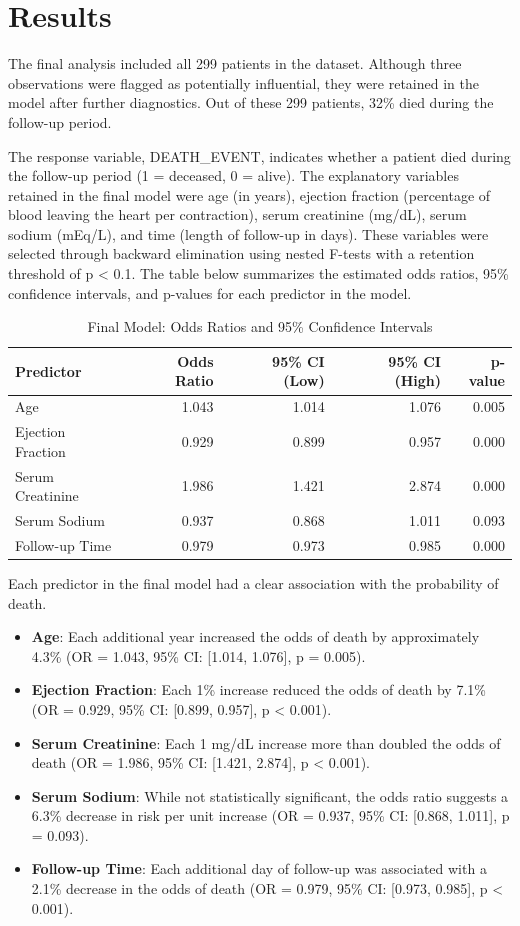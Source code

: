 \documentclass[
  letterpaper,
  DIV=11,
  numbers=noendperiod]{scrartcl}
\begin{document}
\hypertarget{results}{%
\section{Results}\label{results}}

The final analysis included all 299 patients in the dataset. Although
three observations were flagged as potentially influential, they were
retained in the model after further diagnostics. Out of these 299
patients, 32\% died during the follow-up period.

The response variable, DEATH\_EVENT, indicates whether a patient died
during the follow-up period (1 = deceased, 0 = alive). The explanatory
variables retained in the final model were age (in years), ejection
fraction (percentage of blood leaving the heart per contraction), serum
creatinine (mg/dL), serum sodium (mEq/L), and time (length of follow-up
in days). These variables were selected through backward elimination
using nested F-tests with a retention threshold of p \textless{} 0.1.
The table below summarizes the estimated odds ratios, 95\% confidence
intervals, and p-values for each predictor in the model.

\begin{longtable}[t]{lrrrr}
\caption{Final Model: Odds Ratios and 95\% Confidence Intervals}\\
\toprule
Predictor & Odds Ratio & 95\% CI (Low) & 95\% CI (High) & p-value\\
\midrule
Age & 1.043 & 1.014 & 1.076 & 0.005\\
Ejection Fraction & 0.929 & 0.899 & 0.957 & 0.000\\
Serum Creatinine & 1.986 & 1.421 & 2.874 & 0.000\\
Serum Sodium & 0.937 & 0.868 & 1.011 & 0.093\\
Follow-up Time & 0.979 & 0.973 & 0.985 & 0.000\\
\bottomrule
\end{longtable}

Each predictor in the final model had a clear association with the
probability of death.

\begin{itemize}
\item
  \textbf{Age}: Each additional year increased the odds of death by
  approximately 4.3\% (OR = 1.043, 95\% CI: {[}1.014, 1.076{]}, p =
  0.005).
\item
  \textbf{Ejection Fraction}: Each 1\% increase reduced the odds of
  death by 7.1\% (OR = 0.929, 95\% CI: {[}0.899, 0.957{]}, p \textless{}
  0.001).
\item
  \textbf{Serum Creatinine}: Each 1 mg/dL increase more than doubled the
  odds of death (OR = 1.986, 95\% CI: {[}1.421, 2.874{]}, p \textless{}
  0.001).
\item
  \textbf{Serum Sodium}: While not statistically significant, the odds
  ratio suggests a 6.3\% decrease in risk per unit increase (OR = 0.937,
  95\% CI: {[}0.868, 1.011{]}, p = 0.093).
\item
  \textbf{Follow-up Time}: Each additional day of follow-up was
  associated with a 2.1\% decrease in the odds of death (OR = 0.979,
  95\% CI: {[}0.973, 0.985{]}, p \textless{} 0.001).
\end{itemize}
\end{document}
